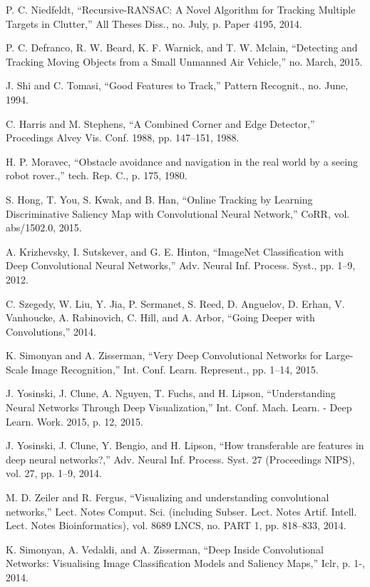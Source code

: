 \documentclass[hidelinks]{article}
\begin{document}
\begin{thebibliography}{99}
\small

 P. C. Niedfeldt, “Recursive-RANSAC: A Novel Algorithm for Tracking Multiple Targets in Clutter,” All Theses Diss., no. July, p. Paper 4195, 2014.

 P. C. Defranco, R. W. Beard, K. F. Warnick, and T. W. Mclain, “Detecting and Tracking Moving Objects from a Small Unmanned Air Vehicle,” no. March, 2015.

 J. Shi and C. Tomasi, “Good Features to Track,” Pattern Recognit., no. June, 1994.

 C. Harris and M. Stephens, “A Combined Corner and Edge Detector,” Procedings Alvey Vis. Conf. 1988, pp. 147–151, 1988.

 H. P. Moravec, “Obstacle avoidance and navigation in the real world by a seeing robot rover.,” tech. Rep. C., p. 175, 1980.

 S. Hong, T. You, S. Kwak, and B. Han, “Online Tracking by Learning Discriminative Saliency Map with Convolutional Neural Network,” CoRR, vol. abs/1502.0, 2015.

 A. Krizhevsky, I. Sutskever, and G. E. Hinton, “ImageNet Classification with Deep Convolutional Neural Networks,” Adv. Neural Inf. Process. Syst., pp. 1–9, 2012.

 C. Szegedy, W. Liu, Y. Jia, P. Sermanet, S. Reed, D. Anguelov, D. Erhan, V. Vanhoucke, A. Rabinovich, C. Hill, and A. Arbor, “Going Deeper with Convolutions,” 2014.

 K. Simonyan and A. Zisserman, “Very Deep Convolutional Networks for Large-Scale Image Recognition,” Int. Conf. Learn. Represent., pp. 1–14, 2015.

 J. Yosinski, J. Clune, A. Nguyen, T. Fuchs, and H. Lipson, “Understanding Neural Networks Through Deep Visualization,” Int. Conf. Mach. Learn. - Deep Learn. Work. 2015, p. 12, 2015.

 J. Yosinski, J. Clune, Y. Bengio, and H. Lipson, “How transferable are features in deep neural networks?,” Adv. Neural Inf. Process. Syst. 27 (Proceedings NIPS), vol. 27, pp. 1–9, 2014.

 M. D. Zeiler and R. Fergus, “Visualizing and understanding convolutional networks,” Lect. Notes Comput. Sci. (including Subser. Lect. Notes Artif. Intell. Lect. Notes Bioinformatics), vol. 8689 LNCS, no. PART 1, pp. 818–833, 2014.

 K. Simonyan, A. Vedaldi, and A. Zisserman, “Deep Inside Convolutional Networks: Visualising Image Classification Models and Saliency Maps,” Iclr, p. 1-, 2014.


\end{thebibliography}
\end{document}
